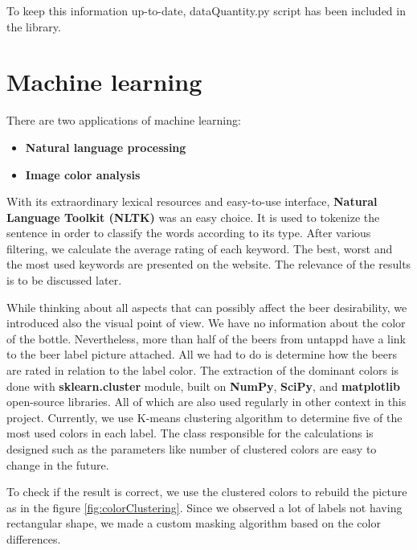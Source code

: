 \documentclass[10pt]{IEEEtran}
\begin{document}
To keep this information up-to-date, dataQuantity.py script has been included in the library. 

\section{Machine learning}
There are two applications of machine learning: 

\begin{itemize}
  \item \textbf{Natural language processing}
  \item \textbf{Image color analysis}
\end{itemize}

With its extraordinary lexical resources and easy-to-use interface, \textbf{Natural Language Toolkit (NLTK)} was an easy choice. It is used to tokenize the sentence in order to classify the words according to its type. After various filtering, we calculate the average rating of each keyword. The best, worst and the most used keywords are presented on the website. The relevance of the results is to be discussed later.

While thinking about all aspects that can possibly affect the beer desirability, we introduced also the visual point of view. We have no information about the color of the bottle. Nevertheless, more than half of the beers from untappd have a link to the beer label picture attached. All we had to do is determine how the beers are rated in relation to the label color. The extraction of the dominant colors is done with \textbf{sklearn.cluster} module, built on \textbf{NumPy}, \textbf{SciPy}, and \textbf{matplotlib} open-source libraries. All of which are also used regularly in other context in this project. Currently, we use K-means clustering algorithm to determine five of the most used colors in each label. The class responsible for the calculations is designed such as the parameters like number of clustered colors are easy to change in the future.

To check if the result is correct, we use the clustered colors to rebuild the picture as in the figure \ref{fig:colorClustering}. Since we observed a lot of labels not having rectangular shape, we made a custom masking algorithm based on the color differences. 
\end{document}
